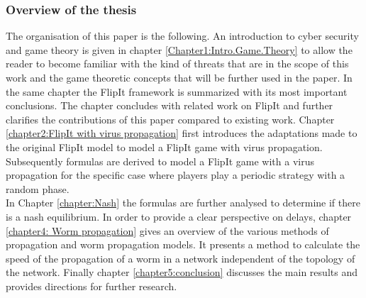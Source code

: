 %

\subsubsection{Overview of the thesis}

The organisation of this paper is the following.  An introduction to cyber security and game theory is given in chapter \ref{Chapter1:Intro.Game.Theory} to allow the reader to become familiar with the kind of threats that are in the scope of this work and the game theoretic concepts that will be further used in the paper. In the same chapter the FlipIt framework is summarized with its most important conclusions. The chapter concludes with related work on FlipIt and further clarifies the contributions of this paper compared to existing work. 
Chapter \ref{chapter2:FlipIt with virus propagation} first introduces the adaptations made to the original FlipIt model to model a FlipIt game with virus propagation. Subsequently formulas are derived to model a FlipIt game with a virus propagation for the specific case where players play a periodic strategy with a random phase. \\
In Chapter \ref{chapter:Nash} the formulas are further analysed to determine if there is a nash equilibrium. 
In order to provide a clear perspective on delays, chapter \ref{chapter4: Worm propagation} gives an overview of the various methods of propagation and worm propagation models. It presents a method to calculate the speed of the propagation of a worm in a network independent of the topology of the network.
Finally chapter \ref{chapter5:conclusion} discusses the main results and provides directions for further research.

